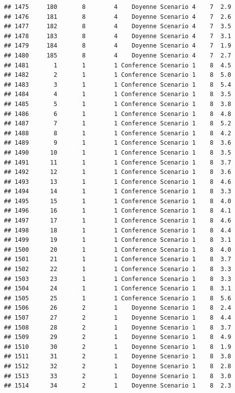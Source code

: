 \documentclass[
]{article}
\begin{document}
\begin{verbatim}
## 1475     180       8        4    Doyenne Scenario 4    7  2.9
## 1476     181       8        4    Doyenne Scenario 4    7  2.6
## 1477     182       8        4    Doyenne Scenario 4    7  3.5
## 1478     183       8        4    Doyenne Scenario 4    7  3.1
## 1479     184       8        4    Doyenne Scenario 4    7  1.9
## 1480     185       8        4    Doyenne Scenario 4    7  2.7
## 1481       1       1        1 Conference Scenario 1    8  4.5
## 1482       2       1        1 Conference Scenario 1    8  5.0
## 1483       3       1        1 Conference Scenario 1    8  5.4
## 1484       4       1        1 Conference Scenario 1    8  3.5
## 1485       5       1        1 Conference Scenario 1    8  3.8
## 1486       6       1        1 Conference Scenario 1    8  4.8
## 1487       7       1        1 Conference Scenario 1    8  5.2
## 1488       8       1        1 Conference Scenario 1    8  4.2
## 1489       9       1        1 Conference Scenario 1    8  3.6
## 1490      10       1        1 Conference Scenario 1    8  3.5
## 1491      11       1        1 Conference Scenario 1    8  3.7
## 1492      12       1        1 Conference Scenario 1    8  3.6
## 1493      13       1        1 Conference Scenario 1    8  4.6
## 1494      14       1        1 Conference Scenario 1    8  3.3
## 1495      15       1        1 Conference Scenario 1    8  4.0
## 1496      16       1        1 Conference Scenario 1    8  4.1
## 1497      17       1        1 Conference Scenario 1    8  4.6
## 1498      18       1        1 Conference Scenario 1    8  4.4
## 1499      19       1        1 Conference Scenario 1    8  3.1
## 1500      20       1        1 Conference Scenario 1    8  4.0
## 1501      21       1        1 Conference Scenario 1    8  3.7
## 1502      22       1        1 Conference Scenario 1    8  3.3
## 1503      23       1        1 Conference Scenario 1    8  3.3
## 1504      24       1        1 Conference Scenario 1    8  3.1
## 1505      25       1        1 Conference Scenario 1    8  5.6
## 1506      26       2        1    Doyenne Scenario 1    8  2.4
## 1507      27       2        1    Doyenne Scenario 1    8  4.4
## 1508      28       2        1    Doyenne Scenario 1    8  3.7
## 1509      29       2        1    Doyenne Scenario 1    8  4.9
## 1510      30       2        1    Doyenne Scenario 1    8  1.9
## 1511      31       2        1    Doyenne Scenario 1    8  3.8
## 1512      32       2        1    Doyenne Scenario 1    8  2.8
## 1513      33       2        1    Doyenne Scenario 1    8  3.0
## 1514      34       2        1    Doyenne Scenario 1    8  2.3

\end{verbatim}
\end{document}

